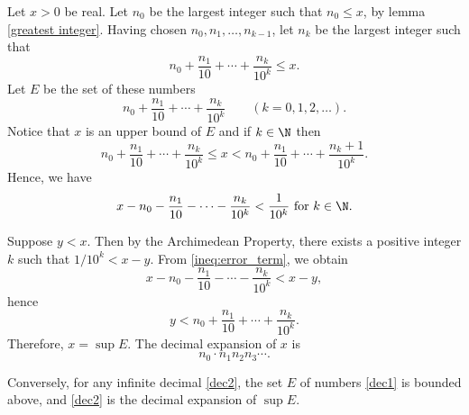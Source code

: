 \begin{remark}[Decimals]
Let $x>0$ be real. 
Let $n_0$ be the largest integer such that $n_0 \leq x$, by lemma \ref{greatest integer}.
Having chosen $n_0, n_1, \ldots, n_{k-1}$, let $n_k$ be the largest integer such that 
\[
n_0 + \frac{n_1}{10} + \cdots + \frac{n_k}{10^k} \leq x.
\]
Let $E$ be the set of these numbers 
\begin{equation} \label{dec1}
n_0 + \frac{n_1}{10} + \cdots + \frac{n_k}{10^k} \qquad (k=0, 1, 2, \ldots).
\end{equation}
Notice that $x$ is an upper bound of $E$ and if $k \in \N$ then
\[
n_0 + \frac{n_1}{10} + \cdots + \frac{n_k}{10^k} \leq x < n_0 + \frac{n_1}{10} + \cdots + \frac{n_k+1}{10^k}.
\]
Hence, we have
\begin{equation} \label{ineq:error_term}
x - n_0 - \frac{n_1}{10} - \cdots - \frac{n_k}{10^k} < \frac{1}{10^k} \text{ for } k  \in \N.
\end{equation}

Suppose $y<x$. Then by the Archimedean Property, there exists a positive integer $k$ such that $1/10^k<x-y$.
From \eqref{ineq:error_term}, we obtain 
\[
x - n_0 - \frac{n_1}{10} - \cdots - \frac{n_k}{10^k}<x-y,
\]
hence 
\[
y<n_0 + \frac{n_1}{10} + \cdots + \frac{n_k}{10^k}.
\]
Therefore, $x=\sup E$. The decimal expansion of $x$ is 
\begin{equation} \label{dec2}
n_0 \cdot n_1 n_2 n_3 \cdots .
\end{equation}

Conversely, for any infinite decimal \eqref{dec2}, the set $E$ of numbers \eqref{dec1} is bounded above, and \eqref{dec2} is the decimal expansion of $\sup E$.
\end{remark}
